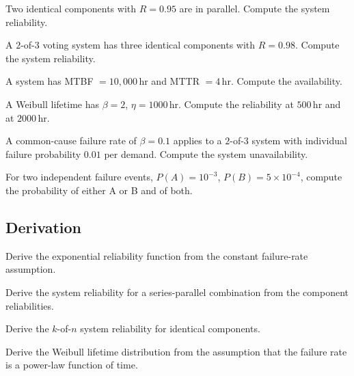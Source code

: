 \begin{exercise}
Two identical components with $R = 0.95$ are in parallel. Compute the system reliability.
\end{exercise}

\begin{exercise}
A $2$-of-$3$ voting system has three identical components with $R = 0.98$. Compute the system reliability.
\end{exercise}

\begin{exercise}
A system has MTBF $= 10{,}000\,\text{hr}$ and MTTR $= 4\,\text{hr}$. Compute the availability.
\end{exercise}

\begin{exercise}
A Weibull lifetime has $\beta = 2$, $\eta = 1000\,\text{hr}$. Compute the reliability at $500\,\text{hr}$ and at $2000\,\text{hr}$.
\end{exercise}

\begin{exercise}
A common-cause failure rate of $\beta = 0.1$ applies to a $2$-of-$3$ system with individual failure probability $0.01$ per demand. Compute the system unavailability.
\end{exercise}

\begin{exercise}
For two independent failure events, $P(A) = 10^{-3}$, $P(B) = 5 \times 10^{-4}$, compute the probability of either A or B and of both.
\end{exercise}

\subsection*{Derivation}

\begin{exercise}
Derive the exponential reliability function from the constant failure-rate assumption.
\end{exercise}

\begin{exercise}
Derive the system reliability for a series-parallel combination from the component reliabilities.
\end{exercise}

\begin{exercise}
Derive the $k$-of-$n$ system reliability for identical components.
\end{exercise}

\begin{exercise}
Derive the Weibull lifetime distribution from the assumption that the failure rate is a power-law function of time.
\end{exercise}

